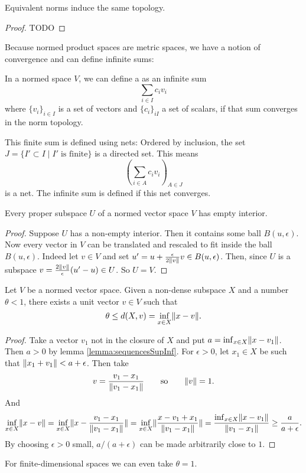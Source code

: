 \begin{proposition}
Equivalent norms induce the same topology.
\end{proposition}
\begin{proof}
TODO
\end{proof}

Because normed product spaces are metric spaces, we have a notion of convergence and can define infinite sums:
\begin{definition}
In a normed space $V$, we can define a  as an infinite sum
\[ \sum_{i\in I} c_i v_i  \]
where $\{v_i\}_{i\in I}$ is a set of vectors and $\{c_i\}_{i I}$ a set of scalars, if that sum converges in the norm topology.
\end{definition}
\begin{note}
This finite sum is defined using nets:
Ordered by inclusion, the set $J = \{I'\subset I \;|\; I' \; \text{is finite}\}$ is a directed set. This means
\[ \left(\sum_{i\in A}c_iv_i \right)_{A\in J} \]
is a net. The infinite sum is defined if this net converges.
\end{note}

\begin{lemma}
Every proper subspace $U$ of a normed vector space $V$ has empty interior.
\end{lemma}
\begin{proof}
Suppose $U$ has a non-empty interior. Then it contains some ball $B(u,\epsilon)$. Now every vector in $V$ can be translated and rescaled to fit inside the ball $B(u,\epsilon)$. Indeed let $v\in V$ and set $u' = u+ \frac{\epsilon}{2\lVert v\rVert}v \in B(u,\epsilon)$. Then, since $U$ is a subspace $v = \frac{2\lVert v\rVert}{\epsilon}(u'-u)\in U$. So $U=V$.
\end{proof}

\begin{lemma} \label{lemma:RieszsLemma}
Let $V$ be a normed vector space. Given a non-dense subspace $X$ and a number $\theta<1$, there exists a unit vector $v\in V$ such that
\[ \theta \leq d(X,v) = \inf_{x\in X}\lVert x-v\rVert. \]
\end{lemma}
\begin{proof}
Take a vector $v_1$ not in the closure of $X$ and put $a = \inf_{x\in X}\lVert x-v_1\rVert$. Then $a>0$ by lemma \ref{lemma:sequencesSupInf}. For $\epsilon > 0$, let $x_1\in X$ be such that $\lVert x_1+v_1\rVert<a+\epsilon$. Then take
\[ v = \frac{v_1 - x_1}{\lVert v_1-x_1\rVert} \qquad \text{so} \qquad \lVert v\rVert=1. \]
And
\[ \inf_{x\in X}\lVert x-v\rVert = \inf_{x\in X}\lVert x-\frac{v_1 - x_1}{\lVert v_1-x_1\rVert}\rVert = \inf_{x\in X}\lVert\frac{x-v_1 + x_1}{\lVert v_1-x_1\rVert}\rVert = \frac{\inf_{x\in X}\lVert x-v_1\rVert}{\lVert v_1-x_1\rVert} \geq \frac{a}{a+\epsilon}. \]
By choosing $\epsilon >0$ small, $a/(a+\epsilon)$ can be made arbitrarily close to $1$.
\end{proof}
For finite-dimensional spaces we can even take $\theta=1$.

